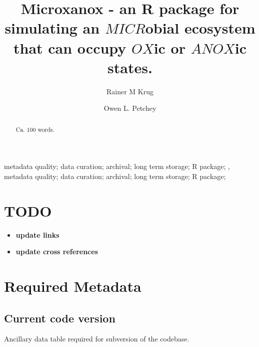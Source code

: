 \documentclass[]{elsarticle} %
\providecommand{\tightlist}{%
  \setlength{\itemsep}{0pt}\setlength{\parskip}{0pt}}
\begin{document}
\begin{frontmatter}

  \title{Microxanox - an R package for simulating an \(MICR\)obial
ecosystem that can occupy \(OX\)ic or \(ANOX\)ic states.}
    \author[University of Zürich]{Rainer M Krug%
  }
    \author[University of Zürich]{Owen L. Petchey}
  
  \begin{abstract}
  Ca. 100 words.
  \end{abstract}
    \begin{keyword}
    metadata quality; data curation; archival; long term storage; R
package; \sep 
    metadata quality; data curation; archival; long term storage; R
package;
  \end{keyword}
  
 \end{frontmatter}

\hypertarget{todo}{%
\section{\texorpdfstring{\color{red}TODO}{TODO}}\label{todo}}

\begin{itemize}
\tightlist
\item
  \color{red}\textbf{update links}
\item
  \color{red}\textbf{update cross references} \pagebreak
\end{itemize}

\hypertarget{required-metadata}{%
\section{Required Metadata}\label{required-metadata}}

\hypertarget{current-code-version}{%
\subsection{Current code version}\label{current-code-version}}

Ancillary data table required for subversion of the codebase.
\end{document}
